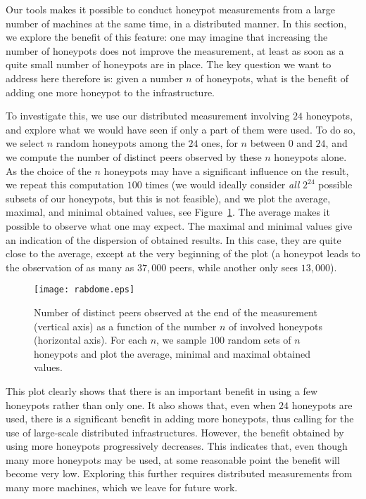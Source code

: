 \documentclass[final,
notitlepage,
narroweqnarray,
	inline,
	twoside,
]{ieee}
\newcommand{\noteperso}[1]{\begin{center}
 \fbox{\begin{minipage}{6cm}#1\end{minipage}}\end{center}}
\renewcommand{\noteperso}[1]{}
\begin{document}
Our tools makes it possible to conduct honeypot measurements from a large number of machines at the same time, in a distributed manner. In this section, we explore the benefit of this feature: one may imagine that increasing the number of honeypots does not improve the measurement, at least as soon as a quite small number of honeypots are in place. The key question we want to address here therefore is: given a number $n$ of honeypots, what is the benefit of adding one more honeypot to the infrastructure.

To investigate this, we use our distributed measurement involving $24$ honeypots, and explore what we would have seen if only a part of them were used. To do so, we select $n$ random honeypots among the $24$ ones, for $n$ between $0$ and $24$, and we compute the number of distinct peers observed by these $n$ honeypots alone. As the choice of the $n$ honeypots may have a significant influence on the result, we repeat this computation $100$ times (we would ideally consider {\em all} $2^{24}$ possible subsets of our honeypots, but this is not feasible), and we plot the average, maximal, and minimal obtained values, see Figure~\ref{fig-nbhoneypots}. The average makes it possible to observe what one may expect. The maximal and minimal values give an indication of the dispersion of obtained results. In this case, they are quite close to the average, except at the very beginning of the plot (a honeypot leads to the observation of as many as $37,000$ peers, while another only sees $13,000$).

\noteperso{ML: figure~\ref{fig-nbhoneypots} : ca se termine par une droite ou pas ? moi j'ai dit que non dans le texte, mais a voir ; tracer un fit ? tracer le NB de nouveaux peers par honeypot ?}

\begin{figure}[h!]
\centering
\texttt{[image: rabdome.eps]}
\caption{Number of distinct peers observed at the end of the
  measurement (vertical axis) as a function of the number $n$ of
  involved honeypots (horizontal axis). For each $n$, we sample $100$
  random sets of $n$ honeypots and plot the average, minimal and
  maximal obtained values.}
\label{fig-nbhoneypots}
\end{figure}

This plot clearly shows that there is an important benefit in using a few honeypots rather than only one. It also shows that, even when $24$ honeypots are used, there is a significant benefit in adding more honeypots, thus calling for the use of large-scale distributed infrastructures. However, the benefit obtained by using more honeypots progressively decreases. This indicates that, even though many more honeypots may be used, at some reasonable point the benefit will become very low. Exploring this further requires distributed measurements from many more machines, which we leave for future work.
\end{document}
